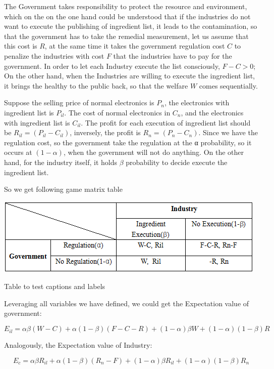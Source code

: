The Government takes responsibility to protect the resource and environment, 
which on the on the one hand could be understood that if the industries do not want to 
execute the publishing of ingredient list, it leads to the contamination, 
so that the government has to take the remedial measurement, let us assume that this cost is $R$, 
at the same time it takes the government regulation cost $C$ to penalize the
industries with cost $F$ that the industries have to pay for the government. 
In order to let each Industry execute the list consciously, $F-C >0$; On the other hand, 
when the Industries are willing to execute the ingredient list, it brings the healthy to 
the public back, so that the welfare $W$ comes sequentially.

Suppose the selling price of normal electronics is $P_n$, the electronics with ingredient list is $P_{il}$. 
The cost of normal electronics in $C_n$, and the electronics with ingredient list is $C_{il}$. 
The profit for each execution of ingredient list should be $R_{il} = (P_{il}-C_{il})$, inversely, 
the profit is $R_n = (P_n-C_n)$. Since we have the regulation cost, 
so the government take the regulation at the α probability, so it occurs at $(1-\alpha)$, 
when the government will not do anything. On the other hand, for the industry itself, 
it holds $\beta$ probability to decide execute the ingredient list.

So we get following game matrix table

\begin{center}
\begin{table}[!htbp]
\includegraphics[width=0.5\columnwidth]{figure/result.png}
\label{table:2}
\caption{Table to test captions and labels}
\end{table}
\end{center}

Leveraging all variables we have defined, we could get the Expectation value of government:

\[
E_{il} = \alpha\beta(W-C) + \alpha(1-\beta)(F-C-R) + (1-\alpha)\beta W + (1-\alpha)(1-\beta)R
\]

Analogously, the Expectation value of Industry:

\[
E_c = \alpha\beta R_{il} + \alpha(1-\beta)(R_n-F) + (1-\alpha)\beta R_{il} + (1-\alpha)(1-\beta)R_n
\]

